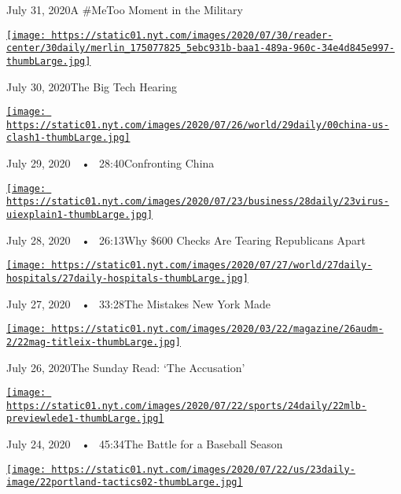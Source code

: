 July 31, 2020A \#MeToo Moment in the Military

\href{https://www.nytimes.com/2020/07/30/podcasts/the-daily/congress-facebook-amazon-google-apple.html?action=click\&module=audio-series-bar\&region=header\&pgtype=Article}{\texttt{[image: https://static01.nyt.com/images/2020/07/30/reader-center/30daily/merlin\_175077825\_5ebc931b-baa1-489a-960c-34e4d845e997-thumbLarge.jpg]}}

July 30, 2020The Big Tech Hearing

\href{https://www.nytimes.com/2020/07/29/podcasts/the-daily/china-trump-foreign-policy.html?action=click\&module=audio-series-bar\&region=header\&pgtype=Article}{\texttt{[image: https://static01.nyt.com/images/2020/07/26/world/29daily/00china-us-clash1-thumbLarge.jpg]}}

July 29, 2020~~•~ 28:40Confronting China

\href{https://www.nytimes.com/2020/07/28/podcasts/the-daily/unemployment-benefits-coronavirus.html?action=click\&module=audio-series-bar\&region=header\&pgtype=Article}{\texttt{[image: https://static01.nyt.com/images/2020/07/23/business/28daily/23virus-uiexplain1-thumbLarge.jpg]}}

July 28, 2020~~•~ 26:13Why \$600 Checks Are Tearing Republicans Apart

\href{https://www.nytimes.com/2020/07/27/podcasts/the-daily/new-york-hospitals-covid.html?action=click\&module=audio-series-bar\&region=header\&pgtype=Article}{\texttt{[image: https://static01.nyt.com/images/2020/07/27/world/27daily-hospitals/27daily-hospitals-thumbLarge.jpg]}}

July 27, 2020~~•~ 33:28The Mistakes New York Made

\href{https://www.nytimes.com/2020/07/26/podcasts/the-daily/the-accusation-the-sunday-read.html?action=click\&module=audio-series-bar\&region=header\&pgtype=Article}{\texttt{[image: https://static01.nyt.com/images/2020/03/22/magazine/26audm-2/22mag-titleix-thumbLarge.jpg]}}

July 26, 2020The Sunday Read: `The Accusation'

\href{https://www.nytimes.com/2020/07/24/podcasts/the-daily/mlb-baseball-season-coronavirus.html?action=click\&module=audio-series-bar\&region=header\&pgtype=Article}{\texttt{[image: https://static01.nyt.com/images/2020/07/22/sports/24daily/22mlb-previewlede1-thumbLarge.jpg]}}

July 24, 2020~~•~ 45:34The Battle for a Baseball Season

\href{https://www.nytimes.com/2020/07/23/podcasts/the-daily/portland-protests.html?action=click\&module=audio-series-bar\&region=header\&pgtype=Article}{\texttt{[image: https://static01.nyt.com/images/2020/07/22/us/23daily-image/22portland-tactics02-thumbLarge.jpg]}}

